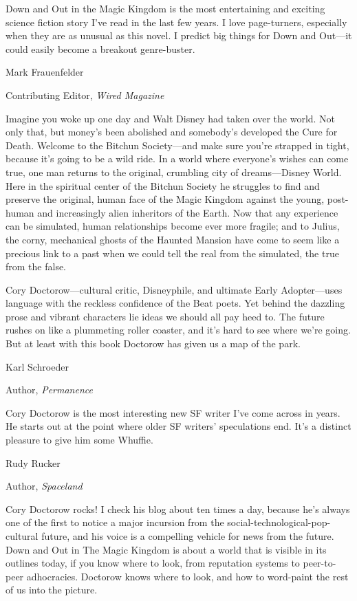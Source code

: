 Down and Out in the Magic Kingdom is the most entertaining and
exciting science fiction story I've read in the last few years. I
love page-turners, especially when they are as unusual as this
novel. I predict big things for Down and Out—it could easily become
a breakout genre-buster.

Mark Frauenfelder

Contributing Editor, \emph{Wired Magazine}

Imagine you woke up one day and Walt Disney had taken over the
world. Not only that, but money's been abolished and somebody's
developed the Cure for Death. Welcome to the Bitchun Society—and
make sure you're strapped in tight, because it's going to be a wild
ride. In a world where everyone's wishes can come true, one man
returns to the original, crumbling city of dreams—Disney World.
Here in the spiritual center of the Bitchun Society he struggles to
find and preserve the original, human face of the Magic Kingdom
against the young, post-human and increasingly alien inheritors of
the Earth. Now that any experience can be simulated, human
relationships become ever more fragile; and to Julius, the corny,
mechanical ghosts of the Haunted Mansion have come to seem like a
precious link to a past when we could tell the real from the
simulated, the true from the false.

Cory Doctorow—cultural critic, Disneyphile, and ultimate Early
Adopter—uses language with the reckless confidence of the Beat
poets. Yet behind the dazzling prose and vibrant characters lie
ideas we should all pay heed to. The future rushes on like a
plummeting roller coaster, and it's hard to see where we're going.
But at least with this book Doctorow has given us a map of the
park.

Karl Schroeder

Author, \emph{Permanence}

Cory Doctorow is the most interesting new SF writer I've come
across in years. He starts out at the point where older SF writers'
speculations end. It's a distinct pleasure to give him some
Whuffie.

Rudy Rucker

Author, \emph{Spaceland}

Cory Doctorow rocks! I check his blog about ten times a day,
because he's always one of the first to notice a major incursion
from the social-technological-pop-cultural future, and his voice is
a compelling vehicle for news from the future. Down and Out in The
Magic Kingdom is about a world that is visible in its outlines
today, if you know where to look, from reputation systems to
peer-to-peer adhocracies. Doctorow knows where to look, and how to
word-paint the rest of us into the picture.

